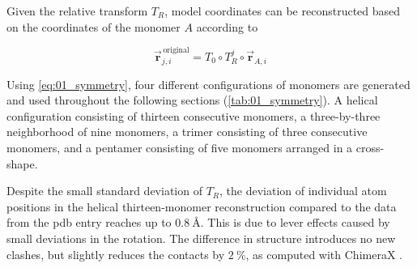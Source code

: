 Given the relative transform $T_R$, model coordinates can be reconstructed based on the coordinates of the monomer $A$ according to 

\begin{equation}\label{eq:01_symmetry}
\vec{\mathbf{r}}_{j,i}^{\,\text{original}} = T_0 \circ T_R^j \circ \vec{\mathbf{r}}_{A,i}
\end{equation}

Using \autoref{eq:01_symmetry}, four different configurations of monomers are generated and used throughout the following sections (\autoref{tab:01_symmetry}). A helical configuration consisting of thirteen consecutive monomers, a three-by-three neighborhood of nine monomers, a trimer consisting of three consecutive monomers, and a pentamer consisting of five monomers arranged in a cross-shape. 

Despite the small standard deviation of $T_R$, the deviation of individual atom positions in the helical thirteen-monomer reconstruction compared to the data from the pdb entry reaches up to $\SI{0.8}{\angstrom}$. This is due to lever effects caused by small deviations in the rotation. The difference in structure introduces no new clashes, but slightly reduces the contacts by $\SI{2}{\percent}$, as computed with ChimeraX \cite{ChimeraX2023}.